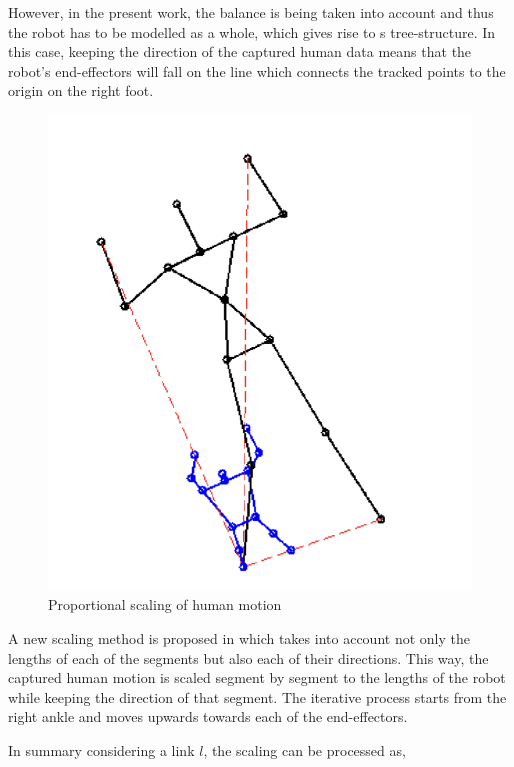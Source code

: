 However, in the present work, the balance is being taken into account and thus the robot has to be modelled as a whole, which gives rise to s 
tree-structure. In this case, keeping the direction of the captured human data means that the robot’s end-effectors will fall on the line which 
connects the tracked points to the origin on the right foot.

\begin{figure}[h!]
    \centering
    \includegraphics[scale=0.7]{images/proportional-scaling.png}\hfill
    \caption{Proportional scaling of human motion \cite{louisepouble}}\hfill
    \label{fig: proportional scaling}
\end{figure}

A new scaling method is proposed in \cite{sakka:hal-01054887} which takes into account not only the
lengths of each of the segments but also each of their directions. This way, the captured
human motion is scaled segment by segment to the lengths of the robot while keeping the 
direction of that segment. The iterative process starts from the right ankle and moves upwards towards each of the end-effectors.

In summary considering a link $l$, the scaling can be processed as,

